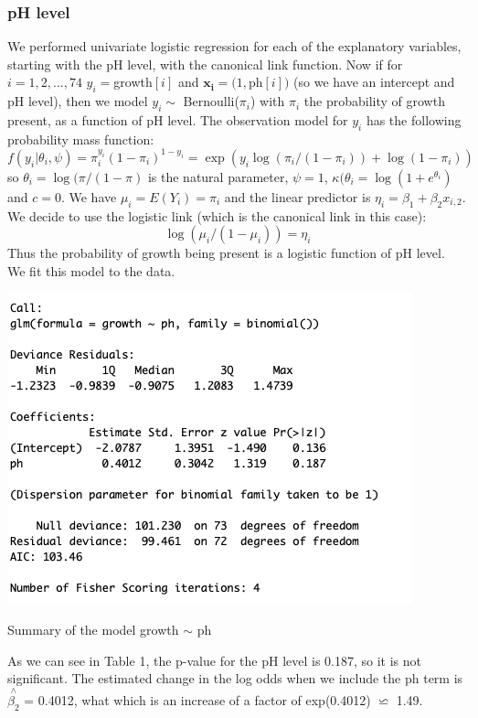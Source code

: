 \documentclass{article}
\begin{document}
\subsubsection{pH level}
We performed univariate logistic regression for each of the explanatory variables, starting with the pH level, with the canonical link function. Now if for $i = 1, 2, ..., 74$  $y_i=$growth$[i] $ and  
$ \boldsymbol{x_i}=(1,$ph$[i]) $
(so we have an intercept and pH level), then we model $y_{i} \sim$   Bernoulli($\pi_i$) with $\pi_i$ the probability of growth present, as a function of pH level. The observation model for $y_i$ has the following probability mass function:
$$ 
f(y_i|\theta_i,\psi)=\pi_i^{y_i}(1-\pi_i)^{1-y_i}= \exp(y_{i}\log(\pi_i/(1-\pi_i))+\log(1-\pi_i))
$$
so $\theta_i=\log(\pi/(1-\pi)$ is the natural parameter, $\psi=1$, $\kappa(\theta_i = \log(1+e^{\theta_i})$ and $c=0$. We have $\mu_i=E(Y_i)=\pi_i$ and the linear predictor is $\eta_i=\beta_1+\beta_2x_{i,2}$. We decide to use the logistic link (which is the canonical link in this case): 
$$
\log(\mu_i/(1-\mu_i))=\eta_i
$$
Thus the probability of growth being present is a logistic function of pH level. 
\\We fit this model to the data. 

\begin{table}[h!]
\includegraphics[scale = 0.5]{table1.png}
\caption{Summary of the model growth $\sim$ ph}
\end{table}

As we can see in Table 1, the p-value for the pH level is 0.187, so it is not significant. 
The estimated change in the log odds when we include the ph term is $\overset{\wedge}{\beta_2} $ = 0.4012, what which is an increase of a factor of exp(0.4012) $\backsimeq $ 1.49.
\end{document}

